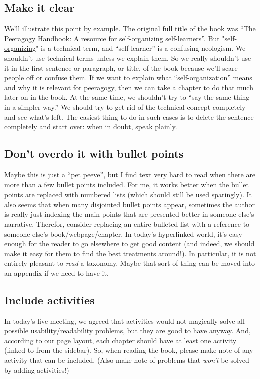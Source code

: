 \subsection{Make it clear}

We'll illustrate this point by example. The original full title of the
book was ``The Peeragogy Handbook: A resource for self-organizing
self-learners''. But
"\href{http://en.wikipedia.org/wiki/Self-organization}{self-organizing}"
is a technical term, and ``self-learner'' is a confusing neologism. We
shouldn't use technical terms unless we explain them. So we really
shouldn't use it in the first sentence or paragraph, or title, of the
book because we'll scare people off or confuse them. If we want to
explain what ``self-organization'' means and why it is relevant for
peeragogy, then we can take a chapter to do that much later on in the
book. At the same time, we shouldn't try to ``say the same thing in a
simpler way.'' We should try to get rid of the technical concept
completely and see what's left. The easiest thing to do in such cases is
to delete the sentence completely and start over: when in doubt, speak
plainly.

\subsection{Don't overdo it with bullet points}

Maybe this is just a ``pet peeve'', but I find text very hard to read
when there are more than a few bullet points included. For me, it works
better when the bullet points are replaced with numbered lists (which
should still be used sparingly). It also seems that when many disjointed
bullet points appear, sometimes the author is really just indexing the
main points that are presented better in someone else's narrative.
Therefor, consider replacing an entire bulleted list with a reference to
someone else's book/webpage/chapter. In today's hyperlinked world, it's
easy enough for the reader to go elsewhere to get good content (and
indeed, we should make it easy for them to find the best treatments
around!). In particular, it is not entirely pleasant to \emph{read} a
taxonomy. Maybe that sort of thing can be moved into an appendix if we
need to have it.

\subsection{Include activities}

In today's live meeting, we agreed that activities would not magically
solve all possible usability/readability problems, but they are good to
have anyway. And, according to our page layout, each chapter should have
at least one activity (linked to from the sidebar). So, when reading the
book, please make note of any activity that can be included. (Also make
note of problems that \emph{won't} be solved by adding activities!)


